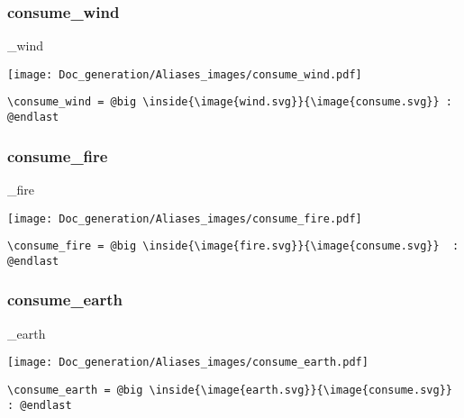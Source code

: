 \documentclass{article}
\begin{document}
\subsubsection{consume\_wind}
\begin{minipage}{0.45\linewidth}
\raggedright
\begin{spverbatim}
\consume_wind 
\end{spverbatim}
\end{minipage}
\begin{minipage}{0.45\linewidth}
\raggedleft
\texttt{[image: Doc\_generation/Aliases\_images/consume\_wind.pdf]}
\end{minipage}
\begin{center}
\begin{BVerbatim}
\consume_wind = @big \inside{\image{wind.svg}}{\image{consume.svg}} : @endlast
\end{BVerbatim}
\end{center}

\subsubsection{consume\_fire}
\begin{minipage}{0.45\linewidth}
\raggedright
\begin{spverbatim}
\consume_fire 
\end{spverbatim}
\end{minipage}
\begin{minipage}{0.45\linewidth}
\raggedleft
\texttt{[image: Doc\_generation/Aliases\_images/consume\_fire.pdf]}
\end{minipage}
\begin{center}
\begin{BVerbatim}
\consume_fire = @big \inside{\image{fire.svg}}{\image{consume.svg}}  : @endlast
\end{BVerbatim}
\end{center}

\subsubsection{consume\_earth}
\begin{minipage}{0.45\linewidth}
\raggedright
\begin{spverbatim}
\consume_earth 
\end{spverbatim}
\end{minipage}
\begin{minipage}{0.45\linewidth}
\raggedleft
\texttt{[image: Doc\_generation/Aliases\_images/consume\_earth.pdf]}
\end{minipage}
\begin{center}
\begin{BVerbatim}
\consume_earth = @big \inside{\image{earth.svg}}{\image{consume.svg}} : @endlast
\end{BVerbatim}
\end{center}
\end{document}
